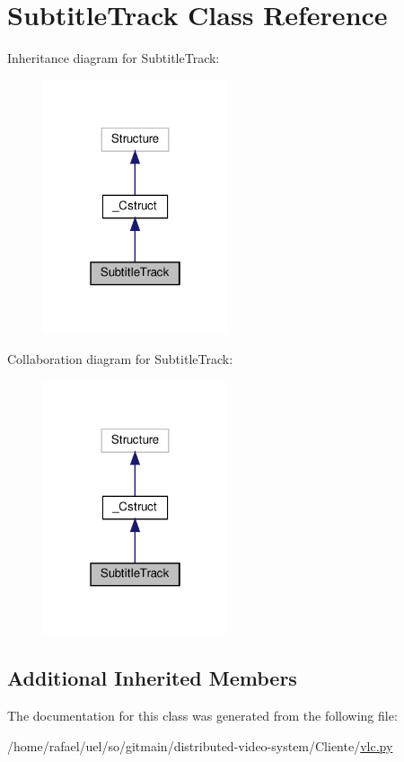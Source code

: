 \hypertarget{classvlc_1_1_subtitle_track}{}\section{Subtitle\+Track Class Reference}
\label{classvlc_1_1_subtitle_track}


Inheritance diagram for Subtitle\+Track\+:
\nopagebreak
\begin{figure}[H]
\begin{center}
\leavevmode
\includegraphics[width=154pt]{classvlc_1_1_subtitle_track__inherit__graph}
\end{center}
\end{figure}


Collaboration diagram for Subtitle\+Track\+:
\nopagebreak
\begin{figure}[H]
\begin{center}
\leavevmode
\includegraphics[width=154pt]{classvlc_1_1_subtitle_track__coll__graph}
\end{center}
\end{figure}
\subsection*{Additional Inherited Members}


The documentation for this class was generated from the following file\+:\begin{DoxyCompactItemize}
\item 
/home/rafael/uel/so/gitmain/distributed-\/video-\/system/\+Cliente/\hyperlink{vlc_8py}{vlc.\+py}\end{DoxyCompactItemize}
